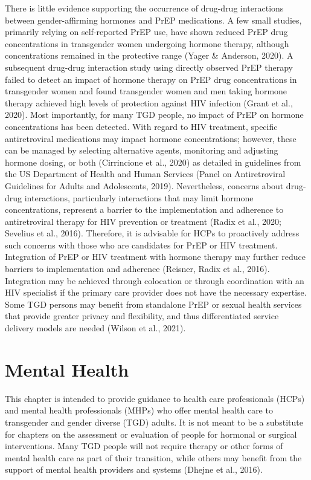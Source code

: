 \documentclass[
]{book}
\begin{document}
There is little evidence supporting the occurrence of drug-drug interactions between
gender-affirming hormones and PrEP medications. A few small studies, primarily relying on
self-reported PrEP use, have shown reduced
PrEP drug concentrations in transgender women
undergoing hormone therapy, although
concentrations remained in the protective range
(Yager \& Anderson, 2020). A subsequent
drug-drug interaction study using directly
observed PrEP therapy failed to detect an impact
of hormone therapy on PrEP drug concentrations in transgender women and found transgender women and men taking hormone therapy
achieved high levels of protection against HIV
infection (Grant et al., 2020). Most importantly,
for many TGD people, no impact of PrEP on
hormone concentrations has been detected. With
regard to HIV treatment, specific antiretroviral
medications may impact hormone concentrations; however, these can be managed by selecting alternative agents, monitoring and adjusting
hormone dosing, or both (Cirrincione et al.,
2020) as detailed in guidelines from the US
Department of Health and Human Services
(Panel on Antiretroviral Guidelines for Adults
and Adolescents, 2019). Nevertheless, concerns
about drug-drug interactions, particularly interactions that may limit hormone concentrations,
represent a barrier to the implementation and
adherence to antiretroviral therapy for HIV prevention or treatment (Radix et al., 2020; Sevelius
et al., 2016). Therefore, it is advisable for HCPs
to proactively address such concerns with those
who are candidates for PrEP or HIV treatment.
Integration of PrEP or HIV treatment with hormone therapy may further reduce barriers to
implementation and adherence (Reisner, Radix
et al., 2016). Integration may be achieved
through colocation or through coordination
with an HIV specialist if the primary care provider does not have the necessary expertise.
Some TGD persons may benefit from standalone
PrEP or sexual health services that provide
greater privacy and flexibility, and thus differentiated service delivery models are needed
(Wilson et al., 2021).

\hypertarget{mental-health-1}{%
\chapter{Mental Health}\label{mental-health-1}}

This chapter is intended to provide guidance to
health care professionals (HCPs) and mental health
professionals (MHPs) who offer mental health care
to transgender and gender diverse (TGD) adults. It
is not meant to be a substitute for chapters on the
assessment or evaluation of people for hormonal or
surgical interventions. Many TGD people will not
require therapy or other forms of mental health care
as part of their transition, while others may benefit
from the support of mental health providers and
systems (Dhejne et al., 2016).
\end{document}
